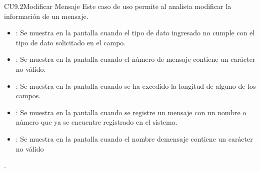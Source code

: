 \begin{UseCase}{CU9.2}{Modificar Mensaje}{
		Este caso de uso permite al analista modificar la información de un mensaje.
	}
{\begin{itemize}
		\item {}: Se muestra en la pantalla  cuando el tipo de dato ingresado no cumple con el tipo de dato solicitado en el campo.
		\item {}: Se muestra en la pantalla  cuando el número de mensaje contiene un carácter no válido.
		\item {}: Se muestra en la pantalla  cuando se ha excedido la longitud de alguno de los campos.
		\item {}: Se muestra en la pantalla  cuando se registre un mensaje con un nombre o número que ya se encuentre registrado en el sistema.
		\item {}: Se muestra en la pantalla  cuando el nombre demensaje contiene un carácter no válido
		\end{itemize}.
		}
	\end{UseCase}
